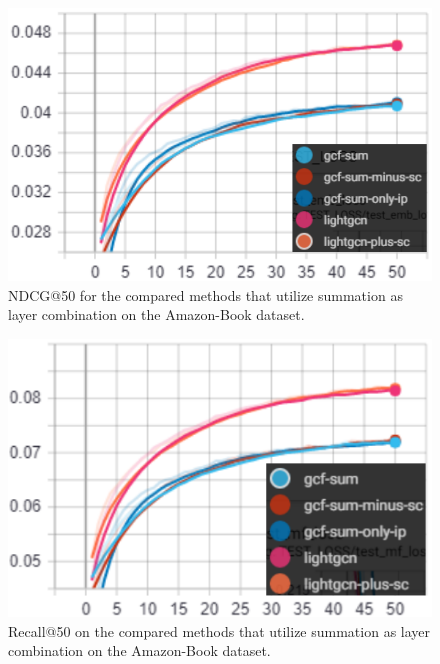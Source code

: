 \begin{figure}[]
    \includegraphics[width=\linewidth]{figures/amazon-book-gcf-sum-ndcg.png}
    \caption{NDCG@50 for the compared methods that utilize summation as layer combination on the Amazon-Book dataset.}
    \label{fig:GCF-sum-NDCG-Amazon-Book-ablation-study}
\end{figure}
\begin{figure}[]
    \includegraphics[width=\linewidth]{figures/amazon-book-gcf-sum-recall.png}
    \caption{Recall@50 on the compared methods that utilize summation as layer combination on the Amazon-Book dataset.}
    \label{fig:GCF-sum-recall-Amazon-Book-ablation-study}
\end{figure}
